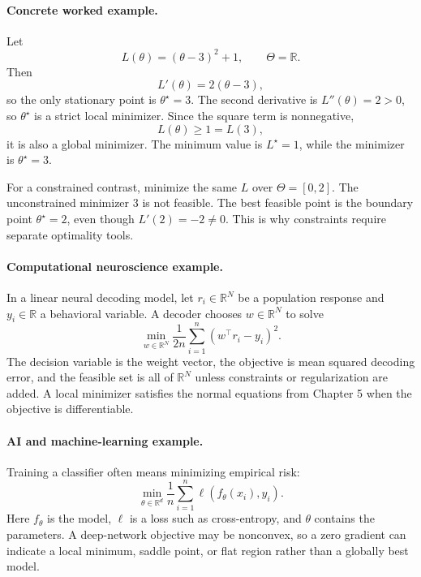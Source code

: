 \paragraph{Concrete worked example.}
Let
\[
L(\theta)=(\theta-3)^2+1,\qquad \Theta=\mathbb R.
\]
Then
\[
L'(\theta)=2(\theta-3),
\]
so the only stationary point is \(\theta^\star=3\). The second derivative is \(L''(\theta)=2>0\), so \(\theta^\star\) is a strict local minimizer. Since the square term is nonnegative,
\[
L(\theta)\ge 1=L(3),
\]
it is also a global minimizer. The minimum value is \(L^\star=1\), while the minimizer is \(\theta^\star=3\).

For a constrained contrast, minimize the same \(L\) over \(\Theta=[0,2]\). The unconstrained minimizer \(3\) is not feasible. The best feasible point is the boundary point \(\theta^\star=2\), even though \(L'(2)=-2\neq 0\). This is why constraints require separate optimality tools.

\paragraph{Computational neuroscience example.}
In a linear neural decoding model, let \(r_i\in\mathbb R^N\) be a population response and \(y_i\in\mathbb R\) a behavioral variable. A decoder chooses \(w\in\mathbb R^N\) to solve
\[
\min_{w\in\mathbb R^N}
\frac{1}{2n}\sum_{i=1}^n (w^\top r_i-y_i)^2.
\]
The decision variable is the weight vector, the objective is mean squared decoding error, and the feasible set is all of \(\mathbb R^N\) unless constraints or regularization are added. A local minimizer satisfies the normal equations from Chapter 5 when the objective is differentiable.

\paragraph{AI and machine-learning example.}
Training a classifier often means minimizing empirical risk:
\[
\min_{\theta\in\mathbb R^d}
\frac{1}{n}\sum_{i=1}^n \ell(f_\theta(x_i),y_i).
\]
Here \(f_\theta\) is the model, \(\ell\) is a loss such as cross-entropy, and \(\theta\) contains the parameters. A deep-network objective may be nonconvex, so a zero gradient can indicate a local minimum, saddle point, or flat region rather than a globally best model.

